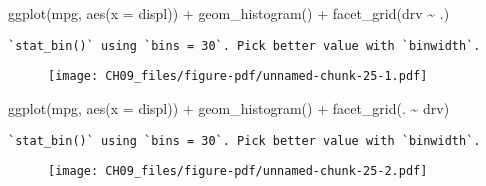 \documentclass[
  letterpaper,
  DIV=11,
  numbers=noendperiod]{scrreprt}
\newenvironment{Shaded}{\begin{snugshade}}{\end{snugshade}}
\newcommand{\AttributeTok}[1]{\textcolor[rgb]{0.40,0.45,0.13}{#1}}
\newcommand{\FunctionTok}[1]{\textcolor[rgb]{0.28,0.35,0.67}{#1}}
\newcommand{\NormalTok}[1]{\textcolor[rgb]{0.00,0.23,0.31}{#1}}
\newcommand{\SpecialCharTok}[1]{\textcolor[rgb]{0.37,0.37,0.37}{#1}}
\begin{document}
\begin{enumerate}
  \begin{tcolorbox}[enhanced jigsaw, breakable, bottomtitle=1mm, left=2mm, colback=white, toprule=.15mm, leftrule=.75mm, colframe=quarto-callout-note-color-frame, colbacktitle=quarto-callout-note-color!10!white, title={Answer}, coltitle=black, toptitle=1mm, bottomrule=.15mm, opacitybacktitle=0.6, arc=.35mm, rightrule=.15mm, titlerule=0mm, opacityback=0]

\begin{Shaded}
\begin{Highlighting}[]
\FunctionTok{ggplot}\NormalTok{(mpg, }\FunctionTok{aes}\NormalTok{(}\AttributeTok{x =}\NormalTok{ displ)) }\SpecialCharTok{+} 
  \FunctionTok{geom\_histogram}\NormalTok{() }\SpecialCharTok{+} 
  \FunctionTok{facet\_grid}\NormalTok{(drv }\SpecialCharTok{\textasciitilde{}}\NormalTok{ .)}
\end{Highlighting}
\end{Shaded}

\begin{verbatim}
`stat_bin()` using `bins = 30`. Pick better value with `binwidth`.
\end{verbatim}

  \begin{figure}[H]

  {\centering \texttt{[image: CH09\_files/figure-pdf/unnamed-chunk-25-1.pdf]}

  }

  \end{figure}

\begin{Shaded}
\begin{Highlighting}[]
\FunctionTok{ggplot}\NormalTok{(mpg, }\FunctionTok{aes}\NormalTok{(}\AttributeTok{x =}\NormalTok{ displ)) }\SpecialCharTok{+} 
  \FunctionTok{geom\_histogram}\NormalTok{() }\SpecialCharTok{+}
  \FunctionTok{facet\_grid}\NormalTok{(. }\SpecialCharTok{\textasciitilde{}}\NormalTok{ drv)}
\end{Highlighting}
\end{Shaded}

\begin{verbatim}
`stat_bin()` using `bins = 30`. Pick better value with `binwidth`.
\end{verbatim}

  \begin{figure}[H]

  {\centering \texttt{[image: CH09\_files/figure-pdf/unnamed-chunk-25-2.pdf]}

  }


\end{figure}
\end{tcolorbox}
\end{enumerate}
\end{document}
